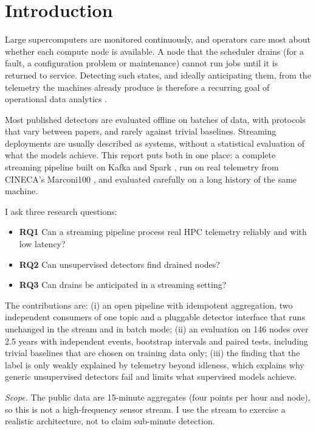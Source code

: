\section{Introduction}
\label{sec:intro}
Large supercomputers are monitored continuously, and operators care most about whether each compute node is available. A node that the scheduler drains (for a fault, a configuration problem or maintenance) cannot run jobs until it is returned to service. Detecting such states, and ideally anticipating them, from the telemetry the machines already produce is therefore a recurring goal of operational data analytics \cite{molan2023ruad,molan2024graafe}.

Most published detectors are evaluated offline on batches of data, with protocols that vary between papers, and rarely against trivial baselines. Streaming deployments are usually described as systems, without a statistical evaluation of what the models achieve. This report puts both in one place: a complete streaming pipeline built on Kafka and Spark \cite{kreps2011kafka,armbrust2018structured}, run on real telemetry from CINECA's Marconi100 \cite{borghesi2023m100}, and evaluated carefully on a long history of the same machine.

I ask three research questions:
\begin{itemize}
  \item \textbf{RQ1} Can a streaming pipeline process real HPC telemetry reliably and with low latency?
  \item \textbf{RQ2} Can unsupervised detectors find drained nodes?
  \item \textbf{RQ3} Can drains be anticipated in a streaming setting?
\end{itemize}

The contributions are: (i) an open pipeline with idempotent aggregation, two independent consumers of one topic and a pluggable detector interface that runs unchanged in the stream and in batch mode; (ii) an evaluation on 146 nodes over 2.5 years with independent events, bootstrap intervals and paired tests, including trivial baselines that are chosen on training data only; (iii) the finding that the label is only weakly explained by telemetry beyond idleness, which explains why generic unsupervised detectors fail and limits what supervised models achieve.

\emph{Scope.} The public data are 15-minute aggregates (four points per hour and node), so this is not a high-frequency sensor stream. I use the stream to exercise a realistic architecture, not to claim sub-minute detection.

